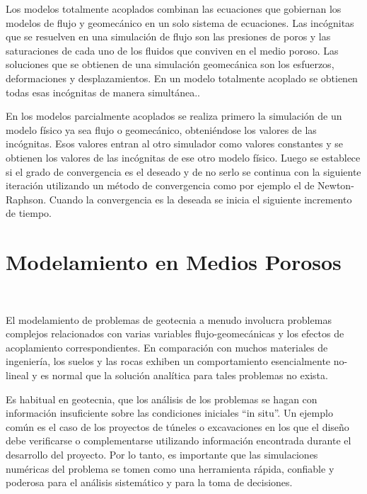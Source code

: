 Los modelos totalmente acoplados combinan las ecuaciones que gobiernan los modelos de flujo y geomecánico en un solo sistema de ecuaciones. Las incógnitas que se resuelven en una simulación de flujo son las presiones de poros y las saturaciones de cada uno de los fluidos que conviven en el medio poroso. Las soluciones que se obtienen de una simulación geomecánica son los esfuerzos, deformaciones y desplazamientos. En un modelo totalmente acoplado se obtienen todas esas incógnitas de manera simultánea.\bigskip.

En los modelos parcialmente acoplados se realiza primero la simulación de un modelo físico ya sea flujo o geomecánico, obteniéndose los valores de las incógnitas. Esos valores entran al otro simulador como valores constantes y se obtienen los valores de las incógnitas de ese otro modelo físico. Luego se establece si el grado de convergencia es el deseado y de no serlo se continua con la siguiente iteración utilizando un método de convergencia como por ejemplo el de Newton-Raphson. Cuando la convergencia es la deseada se inicia el siguiente incremento de tiempo.\bigskip




\section{Modelamiento en Medios Porosos}~\hypertarget{sec:sec230}{}
\label{sec:sec230}

El modelamiento de problemas de geotecnia a menudo involucra problemas complejos relacionados con varias variables flujo-geomecánicas y los efectos de acoplamiento correspondientes. En comparación con muchos materiales de ingeniería, los suelos y las rocas exhiben un comportamiento esencialmente no-lineal y es normal que la solución analítica para tales problemas no exista.\bigskip

Es habitual en geotecnia, que los análisis de los problemas se hagan con información insuficiente sobre las condiciones iniciales “in situ”. Un ejemplo común es el caso de los proyectos de túneles o excavaciones en los que el diseño debe verificarse o complementarse utilizando información encontrada durante el desarrollo del proyecto. Por lo tanto, es importante que las simulaciones numéricas del problema se tomen como una herramienta rápida, confiable y poderosa para el análisis sistemático y para la toma de decisiones.\bigskip

